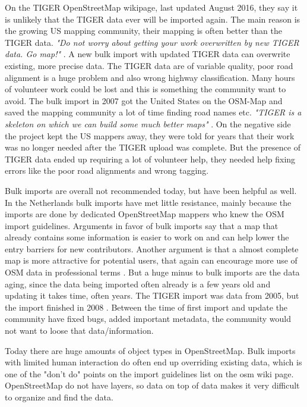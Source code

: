 On the TIGER OpenStreetMap wikipage, last updated August 2016, they say it is unlikely that the TIGER data ever will be imported again. The main reason is the growing US mapping community, their mapping is often better than the TIGER data. \textit{"Do not worry about getting your work overwritten by new TIGER data. Go map!"}  \cite{WikiOSMTIGER2007}. A new bulk import with updated TIGER data can overwrite existing, more precise data. The TIGER data are of variable quality, poor road alignment is a huge problem and also wrong highway classification. Many hours of volunteer work could be lost and this is something the community want to avoid. The bulk import in 2007 got the United States on the OSM-Map and saved the mapping community a lot of time finding road names etc. \textit{"TIGER is a skeleton on which we can build some much better maps"} \cite{Willis2007}. On the negative side the project kept the US mappers away, they were told for years that their work was no longer needed after the TIGER upload was complete. But the presence of TIGER data ended up requiring a lot of volunteer help, they needed help fixing errors like the poor road alignments and wrong tagging. 

Bulk imports are overall not recommended today, but have been helpful as well. In the Netherlands bulk imports have met little resistance, mainly because the imports are done by dedicated OpenStreetMap mappers who knew the OSM import guidelines.  Arguments in favor of bulk imports say that a map that already contains some information is easier to work on and can help lower the entry barriers for new contributors. Another argument is that a almost complete map is more attractive for potential users, that again can encourage more use of OSM data in professional terms \cite{Exelvan2010}. But a huge minus to bulk imports are the data aging, since the data being imported often already is a few years old and updating it takes time, often years. The TIGER import was data from 2005, but the import finished in 2008 \cite{Zielstra2013}. Between the time of first import and update the community have fixed bugs, added important metadata, the community would not want to loose that data/information. 

Today there are huge amounts of object types in OpenStreetMap. Bulk imports with limited human interaction do often end up overriding existing data, which is one of the "don't do" points on the import guidelines list on the osm wiki page. OpenStreetMap do not have layers, so data on top of data makes it very difficult to organize and find the data.   

